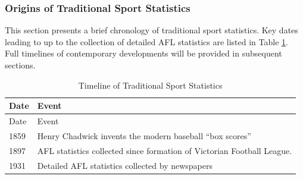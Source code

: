 \subsubsection{Origins of Traditional Sport
Statistics}\label{origins-of-traditional-sport-statistics}

This section presents a brief chronology of traditional sport
statistics. Key dates leading to up to the collection of detailed AFL statistics are listed in Table \ref{tab:sport_stats}. Full timelines of contemporary developments will be provided in subsequent sections.

\begin{longtable}[c]{@{}ll@{}}
\caption{Timeline of Traditional Sport Statistics
\label{tab:sport_stats}}\tabularnewline
\toprule
\begin{minipage}[b]{0.09\columnwidth}\raggedright\strut
Date
\strut\end{minipage} &
\begin{minipage}[b]{0.65\columnwidth}\raggedright\strut
Event
\strut\end{minipage}\tabularnewline
\midrule
\endfirsthead
\toprule
\begin{minipage}[b]{0.09\columnwidth}\raggedright\strut
Date
\strut\end{minipage} &
\begin{minipage}[b]{0.65\columnwidth}\raggedright\strut
Event
\strut\end{minipage}\tabularnewline
\midrule
\endhead
\begin{minipage}[t]{0.09\columnwidth}\raggedright\strut
1859
\strut\end{minipage} &
\begin{minipage}[t]{0.65\columnwidth}\raggedright\strut
Henry Chadwick invents the modern baseball ``box scores''
\strut\end{minipage}\tabularnewline
\begin{minipage}[t]{0.09\columnwidth}\raggedright\strut
1897
\strut\end{minipage} &
\begin{minipage}[t]{0.65\columnwidth}\raggedright\strut
AFL statistics collected since formation of Victorian Football League.
\strut\end{minipage}\tabularnewline
\begin{minipage}[t]{0.09\columnwidth}\raggedright\strut
1931
\strut\end{minipage} &
\begin{minipage}[t]{0.65\columnwidth}\raggedright\strut
Detailed AFL statistics collected by newspapers
\strut\end{minipage}\tabularnewline
\bottomrule
\end{longtable}

